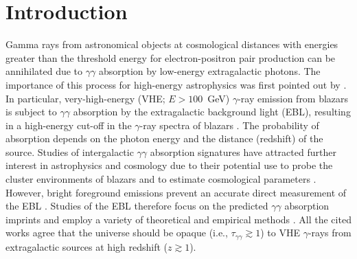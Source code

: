 \documentclass{aastex6}
\begin{document}
\section{Introduction} \label{sec:intro}
Gamma rays from astronomical objects at cosmological distances with energies greater than the threshold 
energy for electron-positron pair production can be annihilated due to $\gamma\gamma$ absorption by 
low-energy extragalactic photons. The importance of this process for high-energy astrophysics was first 
pointed out by \cite{Nishikov62}. In particular, very-high-energy (VHE; $E > 100$~GeV) $\gamma$-ray emission 
from blazars is subject to $\gamma\gamma$ absorption by the extragalactic background light
(EBL), resulting in a high-energy cut-off in the $\gamma$-ray spectra of blazars
\citep[e.g.,][]{Stecker92}. The probability of absorption depends 
on the photon energy and the distance (redshift) of the source. Studies of intergalactic $\gamma\gamma$ absorption 
signatures have attracted further interest in astrophysics and cosmology due to their potential use to probe
the cluster environments of blazars \citep{SB15} and to estimate cosmological parameters \citep{BW15}. 
However, bright foreground emissions prevent an accurate direct measurement of the EBL \citep{HD01}. 
Studies of the EBL therefore focus on the predicted $\gamma\gamma$ absorption imprints and employ
a variety of theoretical and empirical methods 
\citep[e.g.,][]{Stecker69,Stecker92,Aharonian06,Franceschini08,Razzaque09,Finke10,Dominguez11a,Gilmore12}. 
All the cited works agree that the universe should be opaque (i.e., $\tau_{\gamma\gamma} \gtrsim 1$)
to VHE $\gamma$-rays from extragalactic sources at high redshift ($z \gtrsim 1$). 
\end{document}

